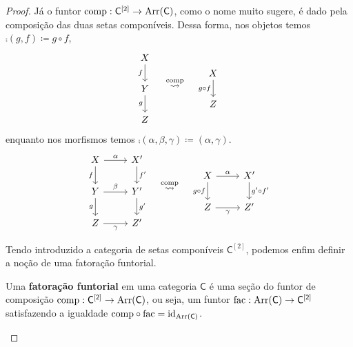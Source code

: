 \begin{proof}
  Já o funtor $\mathrm{comp}: \mathsf{C}^{[2]} \to \mathrm{Arr}(\mathsf{C})$, como o nome muito sugere, é dado pela composição das duas setas componíveis.
  Dessa forma, nos objetos temos $\comp(g,f) \coloneqq g \circ f$,
  \begin{displaymath}
    \begin{tikzcd}
      X
      \arrow[d, "f" swap]
      \\ Y
      \arrow[d, "g" swap]
      \\ Z
    \end{tikzcd}
    \quad \overset{\comp}{\rightsquigarrow} \quad
    \begin{tikzcd}
      X
      \arrow[d, "g \circ f" swap]
      \\ Z
    \end{tikzcd}
  \end{displaymath}
  enquanto nos morfismos temos $\comp(\alpha,\beta,\gamma) \coloneqq (\alpha,\gamma)$.
  \begin{displaymath}
    \begin{tikzcd}
      X
      \arrow[d, "f" swap]
      \arrow[r, "\alpha"]
      & X'
      \arrow[d, "f'"]
      \\ Y
      \arrow[d, "g" swap]
      \arrow[r, "\beta"]
      & Y'
      \arrow[d, "g'"]
      \\ Z
      \arrow[r, "\gamma" swap]
      & Z'
    \end{tikzcd}
    \quad \overset{\comp}{\rightsquigarrow} \quad
    \begin{tikzcd}
      X
      \arrow[d, "g \circ f" swap]
      \arrow[r, "\alpha"]
      & X'
      \arrow[d, "g' \circ f'"]
      \\ Z
      \arrow[r, "\gamma" swap]
      & Z'
    \end{tikzcd}
  \end{displaymath}
  
  Tendo introduzido a categoria de setas componíveis $\mathsf{C}^{[2]}$, podemos enfim definir a noção de uma fatoração funtorial.
  
  \begin{defin}\label{defin:fatoracao_funtorial}
    Uma \textbf{fatoração funtorial} em uma categoria $\mathsf{C}$ é uma seção do funtor de composição $\mathrm{comp}: \mathsf{C^{[2]}} \to \mathrm{Arr}(\mathsf{C})$, ou seja, um funtor $\mathrm{fac}: \mathrm{Arr}(\mathsf{C}) \to \mathsf{C^{[2]}}$ satisfazendo a igualdade $\mathrm{comp} \circ \mathrm{fac} = \mathrm{id}_{\mathrm{Arr}(\mathsf{C})}$.
  \end{defin}
  

\end{proof}

